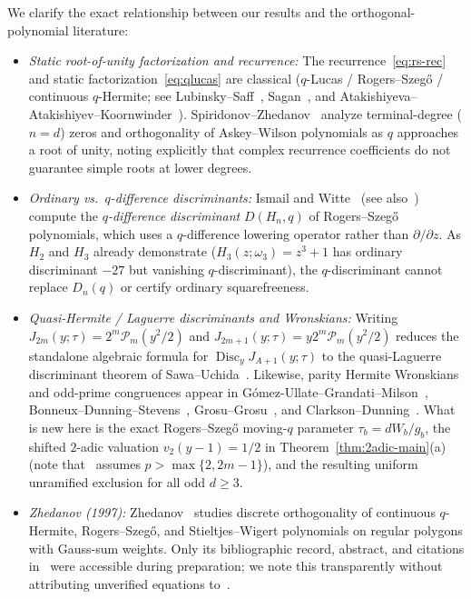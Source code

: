 \documentclass[11pt,reqno]{amsart}
\numberwithin{equation}{section}
\theoremstyle{definition}
\theoremstyle{remark}
\newcommand{\Disc}{\operatorname{Disc}}
\begin{document}
We clarify the exact relationship between our results and the orthogonal-polynomial literature:
\begin{itemize}[leftmargin=1.5em]
\item \emph{Static root-of-unity factorization and recurrence:} The recurrence~\eqref{eq:rs-rec} and static factorization~\eqref{eq:qlucas} are classical ($q$-Lucas / Rogers--Szeg\H{o} / continuous $q$-Hermite; see Lubinsky--Saff~\cite[Lemmas~4.1 and~4.5]{LS87}, Sagan~\cite[Theorem~2.2]{Sag92}, and Atakishiyeva--Atakishiyev--Koornwinder~\cite[\S2]{AKK09}). Spiridonov--Zhedanov~\cite{SZ97} analyze terminal-degree ($n=d$) zeros and orthogonality of Askey--Wilson polynomials as $q$ approaches a root of unity, noting explicitly that complex recurrence coefficients do not guarantee simple roots at lower degrees.
\item \emph{Ordinary vs.\ $q$-difference discriminants:} Ismail and Witte~\cite[(5.12)--(5.17)]{IW01} (see also~\cite{Ism01}) compute the \emph{$q$-difference discriminant} $D(H_n,q)$ of Rogers--Szeg\H{o} polynomials, which uses a $q$-difference lowering operator rather than $\partial/\partial z$. As $H_2$ and $H_3$ already demonstrate ($H_3(z;\omega_3)=z^3+1$ has ordinary discriminant $-27$ but vanishing $q$-discriminant), the $q$-discriminant cannot replace $D_n(q)$ or certify ordinary squarefreeness.
\item \emph{Quasi-Hermite / Laguerre discriminants and Wronskians:} Writing $J_{2m}(y;\tau)=2^m\mathcal{P}_m(y^2/2)$ and $J_{2m+1}(y;\tau)=y2^m\mathcal{P}_m(y^2/2)$ reduces the standalone algebraic formula for $\Disc_y J_{A+1}(y;\tau)$ to the quasi-Laguerre discriminant theorem of Sawa--Uchida~\cite[Theorem~3.6]{SU19}. Likewise, parity Hermite Wronskians and odd-prime congruences appear in G\'omez-Ullate--Grandati--Milson~\cite{GGM18}, Bonneux--Dunning--Stevens~\cite{BDS20}, Grosu--Grosu~\cite[Theorems~7--8]{GG20}, and Clarkson--Dunning~\cite[Eq.~(3.3)]{CD23}. What is new here is the exact Rogers--Szeg\H{o} moving-$q$ parameter $\tau_b=dW_b/g_b$, the shifted $2$-adic valuation $v_2(y-1)=1/2$ in Theorem~\ref{thm:2adic-main}(a) (note that~\cite{GG20} assumes $p>\max\{2,2m-1\}$), and the resulting uniform unramified exclusion for all odd $d\ge 3$.
\item \emph{Zhedanov (1997):} Zhedanov~\cite{Zhe97} studies discrete orthogonality of continuous $q$-Hermite, Rogers--Szeg\H{o}, and Stieltjes--Wigert polynomials on regular polygons with Gauss-sum weights. Only its bibliographic record, abstract, and citations in~\cite{AKK09} were accessible during preparation; we note this transparently without attributing unverified equations to~\cite{Zhe97}.
\end{itemize}
\end{document}
